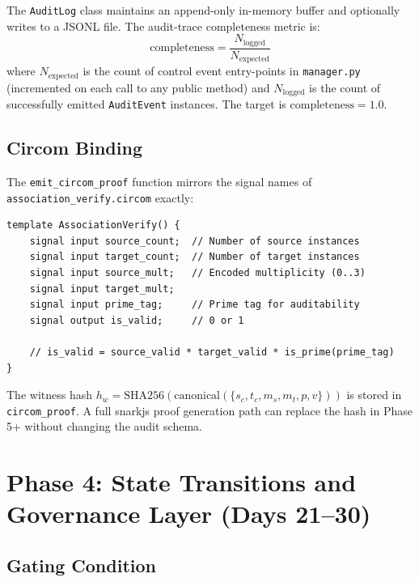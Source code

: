 \documentclass[12pt,letterpaper]{article}
\theoremstyle{definition}
\theoremstyle{remark}
\begin{document}
The \texttt{AuditLog} class maintains an append-only in-memory buffer and optionally
writes to a JSONL file. The audit-trace completeness metric is:
\[
  \text{completeness} = \frac{N_{\text{logged}}}{N_{\text{expected}}} \tag{16}
\]
where \(N_{\text{expected}}\) is the count of control event entry-points in
\texttt{manager.py} (incremented on each call to any public method) and
\(N_{\text{logged}}\) is the count of successfully emitted \texttt{AuditEvent}
instances. The target is \(\text{completeness} = 1.0\).

\subsection{Circom Binding}

The \texttt{emit\_circom\_proof} function mirrors the signal names of
\texttt{association\_verify.circom} exactly:

\begin{noteboxtc}
\begin{lstlisting}[style=circomstyle, caption={association\_verify.circom — signal interface}, label={lst:circom}]
template AssociationVerify() {
    signal input source_count;  // Number of source instances
    signal input target_count;  // Number of target instances
    signal input source_mult;   // Encoded multiplicity (0..3)
    signal input target_mult;
    signal input prime_tag;     // Prime tag for auditability
    signal output is_valid;     // 0 or 1

    // is_valid = source_valid * target_valid * is_prime(prime_tag)
}
\end{lstlisting}
\end{noteboxtc}

The witness hash \(h_w = \text{SHA256}(\text{canonical}(\{s_c, t_c, m_s, m_t, p, v\}))\)
is stored in \texttt{circom\_proof}. A full snarkjs proof generation path can replace
the hash in Phase 5+ without changing the audit schema.

\newpage

\section{Phase 4: State Transitions and Governance Layer (Days 21–30)}

\subsection{Gating Condition}
\end{document}
